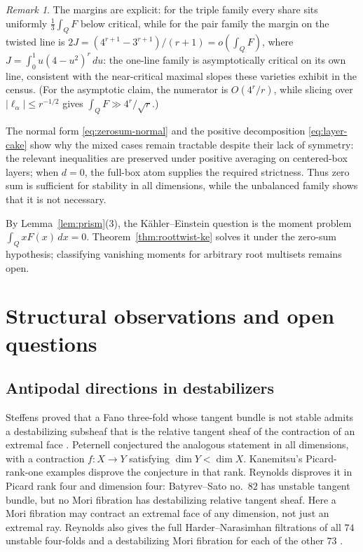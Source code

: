 \documentclass[11pt]{amsart}
\theoremstyle{definition}
\theoremstyle{remark}
\newtheorem{remark}[theorem]{Remark}
\begin{document}
\begin{remark}\label{rem:margins}
The margins are explicit: for the triple family every share sits uniformly
$\tfrac13 \int_Q F$ below critical, while for the pair family the margin on
the twisted line is $2J = (4^{r+1} - 3^{r+1})/(r+1) = o(\int_Q F)$, where
$J=\int_0^1u(4-u^2)^r\,du$: the
one-line family is asymptotically critical on its own line, consistent
with the near-critical maximal slopes these varieties exhibit in the
census. (For the asymptotic claim, the numerator is $O(4^r/r)$, while
slicing over $|\ell_\alpha|\le r^{-1/2}$ gives
$\int_QF\gg4^r/\sqrt r$.)

The normal form \eqref{eq:zerosum-normal} and the positive decomposition
\eqref{eq:layer-cake} show why the mixed cases remain tractable despite their
lack of symmetry: the relevant inequalities are preserved under positive
averaging on centered-box layers; when $d=0$, the full-box atom supplies the
required strictness. Thus zero sum is sufficient
for stability in all dimensions, while the unbalanced family shows that it is
not necessary.
\end{remark}

By Lemma~\ref{lem:prism}(3), the K\"ahler--Einstein question is the moment
problem $\int_QxF(x)\,dx=0$. Theorem~\ref{thm:roottwist-ke} solves it
under the zero-sum hypothesis; classifying vanishing moments for arbitrary
root multisets remains open.

\section{Structural observations and open questions}\label{sec:structure}

\subsection{Antipodal directions in destabilizers}\label{sec:antipodal}
Steffens proved that a Fano three-fold whose tangent bundle is not
stable admits a destabilizing subsheaf that is the relative tangent
sheaf of the contraction of an extremal face \cite{Steffens1996}.
Peternell \cite[Conjecture~3.21]{Peternell2001} conjectured the
analogous statement in all dimensions, with a contraction
$f\colon X\to Y$ satisfying $\dim Y<\dim X$.
Kanemitsu's Picard-rank-one examples \cite{Kanemitsu2021} disprove the
conjecture in that rank. Reynolds \cite[Theorem~2.2.6]{Reynolds2023}
disproves it in Picard rank four and dimension four: Batyrev--Sato
no.~$82$ has unstable tangent bundle, but no Mori fibration has
destabilizing relative tangent sheaf. Here a Mori fibration may contract
an extremal face of any dimension, not just an extremal ray.
Reynolds also gives the full Harder--Narasimhan filtrations of all $74$
unstable four-folds and a destabilizing Mori fibration for each of the
other $73$ \cite[Appendix~A]{Reynolds2023}.
\end{document}
